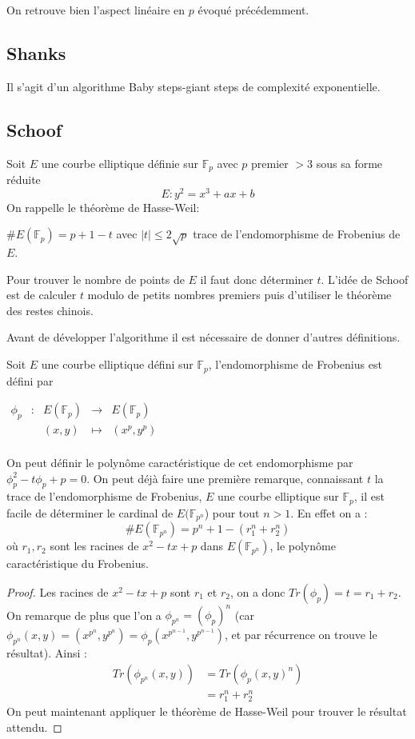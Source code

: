 \documentclass{article}
\begin{document}
On retrouve bien l'aspect linéaire en $p$ évoqué précédemment.
\subsection{Shanks}
Il s'agit d'un algorithme Baby steps-giant steps de complexité exponentielle.

\subsection{Schoof}
Soit $E$ une courbe elliptique définie sur $\mathbb{F}_p$ avec $p$ premier $>3$ sous sa forme réduite 
$$ E: y^2 = x^3 + ax+b$$
On rappelle le théorème de Hasse-Weil:

\begin{thm}
$\#E(\mathbb{F}_p) = p + 1 - t$ avec $|t| \leq 2 \sqrt{p}$ trace de l'endomorphisme de Frobenius de $E$.
\end{thm}
Pour trouver le nombre de points de $E$ il faut donc déterminer $t$. 
L'idée de Schoof est de calculer $t$ modulo de petits nombres premiers puis d'utiliser le théorème des restes chinois. 

Avant de développer l'algorithme il est nécessaire de donner d'autres définitions. 

\begin{defi}[Frobenius]
Soit $E$ une courbe elliptique défini sur $\mathbb{F}_p$, l'endomorphisme de Frobenius est défini par 

$\begin{array}{ccccc}
\phi_p & : & E(\mathbb{F}_p) & \to & E(\mathbb{F}_p) \\
 & & (x,y) & \mapsto & (x^p, y^p) \\
\end{array}$
\end{defi}
On peut définir le polynôme caractéristique de cet endomorphisme par $\phi_p^2 - t \phi_p + p = 0$.
On peut déjà faire une première remarque, connaissant $t$ la trace de l'endomorphisme de Frobenius, $E$ une courbe elliptique sur $\mathbb{F}_p$, il est facile de déterminer le cardinal de $E(\mathbb{F}_{p^n}$) pour tout $n >1$. En effet on a :
\begin{equation*}
\#E(\mathbb{F}_{p^n}) = p^n + 1- (r_1^n + r_2^n)
\end{equation*}
où $r_1, r_2$ sont les racines de $x^2 - tx +p$ dans $E(\mathbb{F}_{p^n})$, le polynôme caractéristique du Frobenius.
\begin{proof}
Les racines de $x^2 - tx +p$ sont $r_1$ et $r_2$, on a donc $Tr(\phi_p) = t = r_1 + r_2$. 
\newline
On remarque de plus que l'on a $\phi_{p^n} = (\phi_p)^n$ (car $\phi_{p^n} (x,y) = (x^{p^n}, y^{p^n}) = \phi_p  (x^{p^{n-1}}, y^{p^{n-1}})$, et par récurrence on trouve le résultat).
\newline
Ainsi : 
\begin{align*}
Tr(\phi_{p^n} (x,y)) &= Tr(\phi_{p} (x,y)^n) \\
					 &= r_1^n + r_2^n	 
\end{align*}
On peut maintenant appliquer le théorème de Hasse-Weil pour trouver le résultat attendu.
\end{proof}
\end{document}
